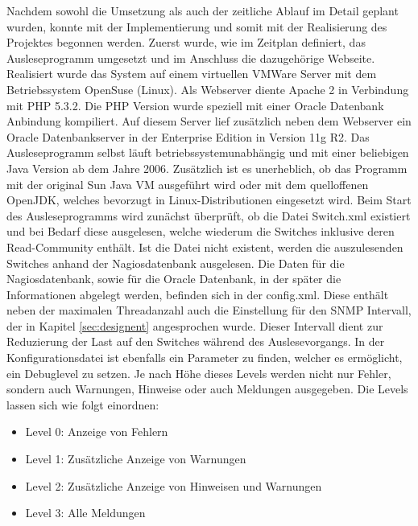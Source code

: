 Nachdem sowohl die Umsetzung als auch der zeitliche Ablauf im Detail geplant wurden, konnte mit der Implementierung und somit mit der Realisierung des Projektes begonnen werden.
Zuerst wurde, wie im Zeitplan definiert, das Ausleseprogramm umgesetzt und im Anschluss die dazugehörige Webseite.
Realisiert wurde das System auf einem virtuellen VMWare Server mit dem Betriebssystem OpenSuse (Linux). Als Webserver diente Apache 2 in Verbindung mit PHP 5.3.2. Die PHP Version wurde speziell mit einer Oracle Datenbank Anbindung kompiliert.
Auf diesem Server lief zusätzlich neben dem Webserver ein Oracle Datenbankserver in der Enterprise Edition in Version 11g R2.
Das Ausleseprogramm selbst läuft betriebssystemunabhängig und mit einer beliebigen Java Version ab dem Jahre 2006. Zusätzlich ist es unerheblich, ob das Programm mit der original Sun Java VM ausgeführt wird oder mit dem quelloffenen OpenJDK, welches bevorzugt in Linux-Distributionen eingesetzt wird.
Beim Start des Ausleseprogramms wird zunächst überprüft, ob die Datei Switch.xml existiert und bei Bedarf diese ausgelesen, welche wiederum die Switches inklusive deren Read-Community enthält. Ist die Datei nicht existent, werden die auszulesenden Switches anhand der Nagiosdatenbank ausgelesen. Die Daten für die Nagiosdatenbank, sowie für die Oracle Datenbank, in der später die Informationen abgelegt werden, befinden sich in der config.xml.
Diese enthält neben der maximalen Threadanzahl auch die Einstellung für den SNMP Intervall, der in Kapitel \ref{sec:designent} angesprochen wurde.
Dieser Intervall dient zur Reduzierung der Last auf den Switches während des Auslesevorgangs.
In der Konfigurationsdatei ist ebenfalls ein Parameter zu finden, welcher es ermöglicht, ein Debuglevel zu setzen.
Je nach Höhe dieses Levels werden nicht nur Fehler, sondern auch Warnungen, Hinweise oder auch Meldungen ausgegeben.
Die Levels lassen sich wie folgt einordnen:\\
\begin{itemize}
\item Level 0: Anzeige von Fehlern
\item Level 1: Zusätzliche Anzeige von Warnungen
\item Level 2: Zusätzliche Anzeige von Hinweisen und Warnungen
\item Level 3: Alle Meldungen\\
\end{itemize}

